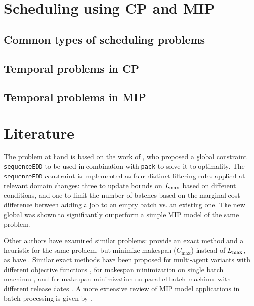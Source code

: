 \documentclass[13pt, letterpaper, oneside]{book}
\begin{document}
\section{Scheduling using CP and MIP}
\subsection{Common types of scheduling problems}
\subsection{Temporal problems in CP}
\subsection{Temporal problems in MIP}

\section{Literature}
The problem at hand is based on the work of \citet{Malapert}, who proposed a global
constraint \texttt{sequenceEDD} to be used in combination with \texttt{pack} to
solve it to optimality. The \texttt{sequenceEDD} constraint is implemented as
four distinct filtering rules applied at relevant domain changes: three to update
bounds on $L_{\text{max}}$ based on different conditions, and one to limit the number of
batches based on the marginal cost difference between adding a job to an empty batch vs. an
existing one. The new global was shown to significantly outperform a simple MIP model of the same problem.

Other authors have examined similar problems: \citet{Azizoglu} provide an exact
method and a heuristic for the same problem, but minimize makespan
($C_\text{max}$) instead of $L_{\text{max}}$, as have \cite{Dupont}. Similar exact
methods have been proposed for multi-agent variants with different objective
functions \citep{Sabouni}, for makespan minimization on single batch machines
\citep{Kashan}, and for makespan minimization on parallel batch machines with
different release dates \citep{Ozturk}. A more extensive review of MIP model
applications in batch processing is given by \citet{Grossmann}.

\end{document}
